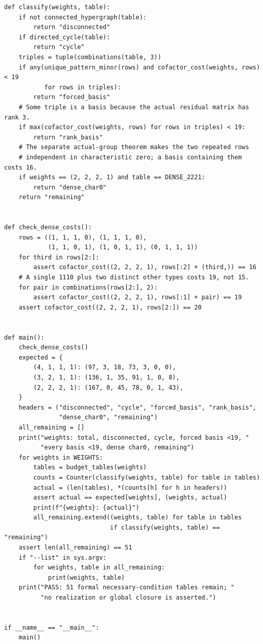 \documentclass[11pt,a4paper,oneside]{report}
\theoremstyle{definition}
\theoremstyle{remark}
\begin{document}
\begin{lstlisting}
def classify(weights, table):
    if not connected_hypergraph(table):
        return "disconnected"
    if directed_cycle(table):
        return "cycle"
    triples = tuple(combinations(table, 3))
    if any(unique_pattern_minor(rows) and cofactor_cost(weights, rows) < 19
           for rows in triples):
        return "forced_basis"
    # Some triple is a basis because the actual residual matrix has rank 3.
    if max(cofactor_cost(weights, rows) for rows in triples) < 19:
        return "rank_basis"
    # The separate actual-group theorem makes the two repeated rows
    # independent in characteristic zero; a basis containing them costs 16.
    if weights == (2, 2, 2, 1) and table == DENSE_2221:
        return "dense_char0"
    return "remaining"


def check_dense_costs():
    rows = ((1, 1, 1, 0), (1, 1, 1, 0),
            (1, 1, 0, 1), (1, 0, 1, 1), (0, 1, 1, 1))
    for third in rows[2:]:
        assert cofactor_cost((2, 2, 2, 1), rows[:2] + (third,)) == 16
    # A single 1110 plus two distinct other types costs 19, not 15.
    for pair in combinations(rows[2:], 2):
        assert cofactor_cost((2, 2, 2, 1), rows[:1] + pair) == 19
    assert cofactor_cost((2, 2, 2, 1), rows[2:]) == 20


def main():
    check_dense_costs()
    expected = {
        (4, 1, 1, 1): (97, 3, 18, 73, 3, 0, 0),
        (3, 2, 1, 1): (136, 1, 35, 91, 1, 0, 8),
        (2, 2, 2, 1): (167, 0, 45, 78, 0, 1, 43),
    }
    headers = ("disconnected", "cycle", "forced_basis", "rank_basis",
               "dense_char0", "remaining")
    all_remaining = []
    print("weights: total, disconnected, cycle, forced basis <19, "
          "every basis <19, dense char0, remaining")
    for weights in WEIGHTS:
        tables = budget_tables(weights)
        counts = Counter(classify(weights, table) for table in tables)
        actual = (len(tables), *(counts[h] for h in headers))
        assert actual == expected[weights], (weights, actual)
        print(f"{weights}: {actual}")
        all_remaining.extend((weights, table) for table in tables
                             if classify(weights, table) == "remaining")
    assert len(all_remaining) == 51
    if "--list" in sys.argv:
        for weights, table in all_remaining:
            print(weights, table)
    print("PASS: 51 formal necessary-condition tables remain; "
          "no realization or global closure is asserted.")


if __name__ == "__main__":
    main()


\end{lstlisting}
\end{document}
